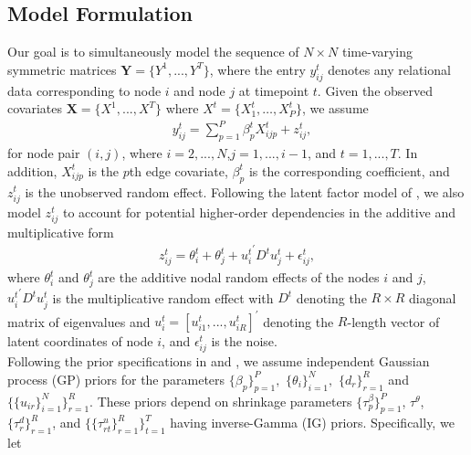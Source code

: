 \documentclass[a4paper]{article}
\begin{document}
\subsection{Model Formulation}\label{subsec: Model formulation}
Our goal is to simultaneously model the sequence of $N \times N$ time-varying symmetric matrices $\mathbf{Y} = \{Y^1,...,Y^T\}$, where the entry $y^t_{ij}$ denotes any relational data corresponding to node $i$ and node $j$ at timepoint $t$. Given the observed covariates $\mathbf{X} = \{X^1,...,X^T\}$ where $X^t = \{X^t_1, \ldots, X^t_P\}$, we assume
\begin{equation}
\begin{aligned}
&y^t_{ij}=\sum\limits_{p=1}^P \beta^t_{p}X^t_{ijp}+z^t_{ij},
\end{aligned}
\end{equation}
for node pair $(i, j)$, where $i=2,...,N$,$j=1,...,i-1$, and $t = 1,...,T$. In addition, $X^t_{ijp}$ is the $p${th} edge covariate, $\beta^t_{p}$ is the corresponding coefficient, and $z^t_{ij}$ is the unobserved random effect. Following the latent factor model of \cite{minhas2016inferential}, we also model $z^t_{ij}$ to account for potential higher-order dependencies in the additive and multiplicative form
\begin{equation}
\begin{aligned}
z^t_{ij} = \theta^t_{i}+\theta^t_{j}+{{u^t_{i}}^\prime D^{t} u^t_{j}}+\epsilon^t_{ij},
\end{aligned}
\end{equation}
where $\theta^t_{i}$ and $\theta^t_{j}$ are the additive nodal random effects of the nodes $i$ and $j$, ${{u^t_{i}}^\prime D^{t} u^t_{j}}$ is the multiplicative random effect with $D^{t}$ denoting the $R\times R$ diagonal matrix of eigenvalues and $u^t_{i}=[u^t_{i1},...,u^t_{iR}]^\prime$ denoting the $R$-length vector of latent coordinates of node $i$, and $\epsilon^t_{ij}$ is the noise.\\ \newline
Following the prior specifications in \cite{bhattacharya2011sparse} and \cite{durante2013nonparametric}, we assume independent Gaussian process (GP) priors for the parameters $\{\beta_{p}\}_{p=1}^P,$ $\{\theta_{i}\}_{i=1}^N,$ $\{d_{r}\}_{r=1}^R$ and $\{\{u_{ir}\}_{i=1}^N\}_{r=1}^R$. These priors depend on shrinkage parameters $\{\tau^{\beta}_p\}_{p=1}^P$, $\tau^{\theta}$, $\{\tau^{d}_r\}_{r=1}^R$, and $\{\{\tau^{u}_{rt}\}_{r=1}^R\}_{t=1}^T$ having inverse-Gamma (IG) priors. Specifically, we let 
\end{document}
